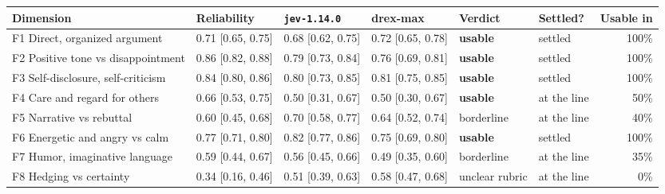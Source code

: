 {\scriptsize\setlength{\tabcolsep}{2.8pt}
\begin{tabular}{@{}l l l l l l r@{}}
\toprule
Dimension & Reliability & \texttt{jev-1.14.0} & drex-max & Verdict & Settled? & Usable in \\
\midrule
F1 Direct, organized argument & 0.71 {\scriptsize[0.65, 0.75]} & 0.68 {\scriptsize[0.62, 0.75]} & 0.72 {\scriptsize[0.65, 0.78]} & \textbf{usable} & settled & 100\% \\
F2 Positive tone vs disappointment & 0.86 {\scriptsize[0.82, 0.88]} & 0.79 {\scriptsize[0.73, 0.84]} & 0.76 {\scriptsize[0.69, 0.81]} & \textbf{usable} & settled & 100\% \\
F3 Self-disclosure, self-criticism & 0.84 {\scriptsize[0.80, 0.86]} & 0.80 {\scriptsize[0.73, 0.85]} & 0.81 {\scriptsize[0.75, 0.85]} & \textbf{usable} & settled & 100\% \\
F4 Care and regard for others & 0.66 {\scriptsize[0.53, 0.75]} & 0.50 {\scriptsize[0.31, 0.67]} & 0.50 {\scriptsize[0.30, 0.67]} & \textbf{usable} & at the line & 50\% \\
F5 Narrative vs rebuttal & 0.60 {\scriptsize[0.45, 0.68]} & 0.70 {\scriptsize[0.58, 0.77]} & 0.64 {\scriptsize[0.52, 0.74]} & borderline & at the line & 40\% \\
F6 Energetic and angry vs calm & 0.77 {\scriptsize[0.71, 0.80]} & 0.82 {\scriptsize[0.77, 0.86]} & 0.75 {\scriptsize[0.69, 0.80]} & \textbf{usable} & settled & 100\% \\
F7 Humor, imaginative language & 0.59 {\scriptsize[0.44, 0.67]} & 0.56 {\scriptsize[0.45, 0.66]} & 0.49 {\scriptsize[0.35, 0.60]} & borderline & at the line & 35\% \\
F8 Hedging vs certainty & 0.34 {\scriptsize[0.16, 0.46]} & 0.51 {\scriptsize[0.39, 0.63]} & 0.58 {\scriptsize[0.47, 0.68]} & unclear rubric & at the line & 0\% \\
\bottomrule
\end{tabular}}
